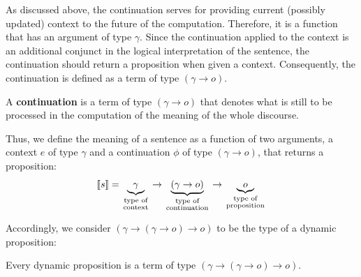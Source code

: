  As discussed above, the continuation serves for providing current (possibly updated) context to the future of the computation. Therefore, it is a function that has an argument of type $\gamma$. Since the continuation applied to the context is an additional conjunct in the logical interpretation of the sentence, the continuation should return a proposition when given a context. Consequently, the continuation is defined as a term of type $(\gamma \rightarrow o)$.


\begin{definition}[Continuation] A \textbf{continuation} is a term of type $(\gamma \rightarrow o)$ that denotes what is still to be processed in the computation of the meaning of the whole discourse. 
\end{definition}

 Thus, we define the meaning of a sentence as a function of two arguments, a context $e$ of type $\gamma$ and a continuation $\phi$ of type $(\gamma \rightarrow o)$, that returns a proposition:
\begin{align}
[\![s]\!] = \underbrace{\gamma}_{\begin{smallmatrix}
\text{type of}\\
\text{context}
\end{smallmatrix}} \rightarrow \underbrace{(\gamma \rightarrow o)}_{\begin{smallmatrix}
\text{type of}\\
\text{continuation}
\end{smallmatrix}} \rightarrow \underbrace{o}_{
\begin{smallmatrix}
\text{type of}\\
\text{proposition}
\end{smallmatrix}} \notag
\end{align}

Accordingly, we consider $(\gamma \rightarrow (\gamma \rightarrow o) \rightarrow o)$ to be the type of a dynamic proposition:
\begin{definition} Every dynamic proposition is a term of type $(\gamma \rightarrow (\gamma \rightarrow o) \rightarrow o)$.
\end{definition}


